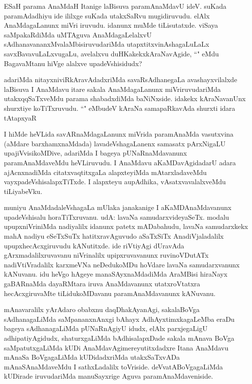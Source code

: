 \begin{artha}
ESaH parama AnaMdaH Itanige laBisuva paramAnaMdavU ideV. suKada paramAdadhiyu ide ililxge suKada utakxSaRvu mugidiruvudu. elAlx AnaMdagaLanunx miVri iruvudu. idanunx muMde tiLisutatxde. viSaya saMpakaRdiMda uMTAguva AnaMdagaLelalxvU sAdhanavananxMvalaMbisiruvudariMda utapxtitxvinAshagaLuLaLx savxBavavuLaLxvugaLu, avelalxvu duHKakekxkAraNavAgide, ``\stext " eMdu BagavaMtanu hiVge alalxve upadeVshisidudx? 
\end{artha}

\begin{artha}
adariMda nitayxniviRkAravAdadxriMda savaRsAdhanegaLa avashayxvilalxde laBisuva I AnaMdavu itare sakala AnaMdagaLanunx miVriruvudariMda utakxqqSaTxveMdu parama shabadxdiMda baNiNxside. idakekx kAraNavanUnx shurxtiye koTiTxruvudu. ``\stext " eMbudeV kAraNa samapaRkavAda shurxti idara tAtapxyaR 
\end{artha}

\begin{artha}
I hiMde heVLida savARnaMdagaLanunx miVrida paramAnaMda vasutxvina (aMdare barxhamxnaMdada) lavadeVshagaLanenx samasatx pArxNigaLU upajiVvisikoMDive, adariMda I bageya pUNaRnaMdavanunx paramAnaMdaveMdu heVLiruvudu. I AnaMdavu aKaMDavAgidadarU adara ajAcnxnadiMda citatxvaqtitxgaLa alapxteyiMda mAtarxladaveMdu vayxpadeVshisalapxTiTxde. I alapxteyu aupAdhika, vAsatxvavalalxveMdu tiLiyabeVku.   
\end{artha}

\begin{artha}
muniyu AnaMdadaleVshagaLa mUlaka janakanige I aKaMDAnaMdavanunx upadeVshisalu horaTiTxruvanu. udA: lavaNa samudarxvideyaSeTx. modalu upupxniVriniMda nadiyalilx idanunx patetx mADabahudu, lavaNa samudarxkekx mahA nadiyu eSeTxSuTx hatitxravAguvudo aSaTxSiTx AnadiVjaladalilx upupxhecAcxgiruvudu kANutitxde. ide riVtiyAgi dUravAda gArxmadalilxruvavanu niVrinalilx upipxruvavanunx ruvinoVDutATx nadiVtiVradalilx karxmeVNa neDedukoMDu hoVdare lavaNa samudarxvanunx kANuvanu. idu heVgo hAgeye manaSAyxnaMdadiMda AraMBisi hiraNayx gaBARnaMda dayaRMtara iruva AnaMdavanunx utatxroVtatxra hecAcxgiruvaMte tiLidukoMDavanu paramAnaMdavanunx kANuvanu. 
\end{artha}


\begin{artha}
mAnavaralilx yArAdaro obabxnu daqDhakAyanAgi, sakalaBoVga sAdhanagaLiMda saMpananxnAnxgi bAhayx AdhAyxtimxkagaLeMba eraDu bageya sAdhanagaLiMda pUNaRnAgiyU idudx, elAlx parxjegaLigU adhipatiyAgidudx, shaturxgaLiMda bAdhisalapxDade sakala mAnava BoVga saMpatutxgaLiMda kUDi AnaMdavAgimereyutitxdadxre Itana AnaMdavu mAnaSa BoVgagaLiMda kUDidadxriMda utakxSaTxvADa mAnaSAnaMdaveMdu I sathxLadalilx toVriside. deVvatABoVgagaLiMda kUDirade iruvudariMda manuSayxrige Aguva paramAnaMdaveniside. 
\end{artha}

